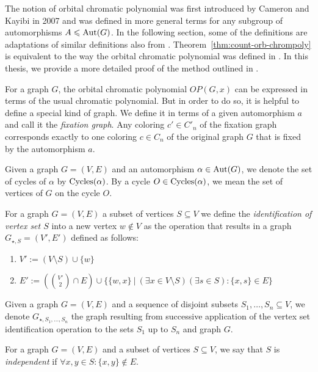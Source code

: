 The notion of orbital chromatic polynomial was first introduced by Cameron and Kayibi \cite{caka2007} in 2007 and was defined in more general terms for any subgroup of automorphisms $A \leqslant  \operatorname{Aut}(G)$. In the following section, some of the definitions are adaptations of similar definitions also from \cite{caka2007}.  Theorem~\ref{thm:count-orb-chrompoly} is equivalent to the way the orbital chromatic polynomial was defined in \cite{caka2007}. In this thesis, we provide a more detailed proof of the method outlined in \cite{caka2007}. 

For a graph $G$, the orbital chromatic polynomial $OP(G,x)$ can be expressed in terms of the usual chromatic polynomial. But in order to do so, it is helpful to define a special kind of graph. We define it in terms of a given automorphism $a$ and call it the \textit{fixation graph}. Any coloring $c' \in C'_n$ of the fixation graph corresponds exactly to one coloring $c \in C_n$ of the original graph $G$ that is fixed by the automorphism $a$.

\begin{defn}
    Given a graph $G=(V,E)$ and an automorphism $\alpha \in \operatorname{Aut}(G)$, we denote the set of cycles of $\alpha$ by $\operatorname{Cycles}(\alpha)$. By a cycle $O \in \operatorname{Cycles}(\alpha)$, we mean the set of vertices of $G$ on the cycle $O$.
\end{defn}

\begin{defn}
    For a graph $G=(V,E)$ a subset of vertices $S \subseteq V$ we define the \emph{identification of vertex set $S$} into a new vertex $w \notin V$ as the operation that results in a graph $G_{\star,S}=(V',E')$ defined as follows:
    \begin{enumerate}
        \item $V' := (V \setminus S) \cup \{w\}$
        \item $E' := \left( \binom{V'}{2} \cap E\right) \cup \{ \{w,x\} \ | \ (\exists x \in V \setminus S)(\exists s \in S): \{x,s\} \in E\}$
    \end{enumerate}
\end{defn}

Given a graph $G=(V,E)$ and a sequence of disjoint subsets $S_1, \ldots , S_n \subseteq V$, we denote $G_{\star,S_1,\ldots,S_n}$ the graph resulting from successive application of the vertex set identification operation to the sets $S_1$ up to $S_n$ and graph $G$.

\begin{defn}
    For a graph $G=(V,E)$ and a subset of vertices $S \subseteq V$, we say that $S$ is \emph{independent} if $\forall x,y \in S : \{x,y\} \notin E$.
\end{defn}

